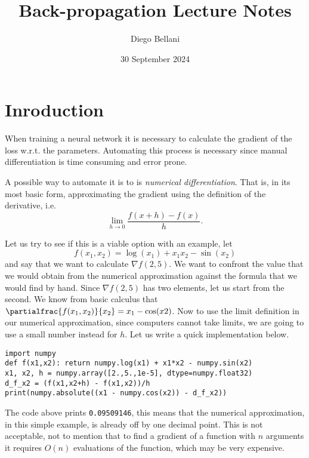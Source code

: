 \documentclass{article}
\title{Back-propagation Lecture Notes}
\author{Diego Bellani}
\date{30 September 2024}
\begin{document}
\maketitle

\section{Inroduction}

When training a neural network it is necessary to calculate the gradient of the
loss w.r.t. the parameters. Automating this process is necessary since manual
differentiation is time consuming and error prone.

A possible way to automate it is to is \emph{numerical differentiation}. That
is, in its most basic form, approximating the gradient using the definition of
the derivative, i.e. \[\lim_{h \to 0} \frac{f(x+h)-f(x)} h.\]

Let us try to see if this is a viable option with an example, let
\begin{equation}
f(x_1, x_2) = \log(x_1)+x_1x_2-\sin(x_2) \label{eqn:example}
\end{equation}
and say that we want to calculate \(\nabla{f(2,5)}\). We want to confront the
value that we would obtain from the numerical approximation against the formula
that we would find by hand. Since \(\nabla{f(2,5)}\) has two elements, let us
start from the second. We know from basic calculus that
\(\partialfrac{f(x_1,x_2)}{x_2} = x_1-\cos(x2)\). Now to use the limit
definition in our numerical approximation, since computers cannot take limits,
we are going to use a small number instead for \(h\). Let us write a quick
implementation below.

\begin{verbatim}
import numpy
def f(x1,x2): return numpy.log(x1) + x1*x2 - numpy.sin(x2)
x1, x2, h = numpy.array([2.,5.,1e-5], dtype=numpy.float32)
d_f_x2 = (f(x1,x2+h) - f(x1,x2))/h
print(numpy.absolute((x1 - numpy.cos(x2)) - d_f_x2))
\end{verbatim}

The code above prints \texttt{0.09509146}, this means that the numerical
approximation, in this simple example, is already off by one decimal point.
This is not acceptable, not to mention that to find a gradient of a function
with \(n\) arguments it requires \(O(n)\) evaluations of the function, which may
be very expensive.
\end{document}
